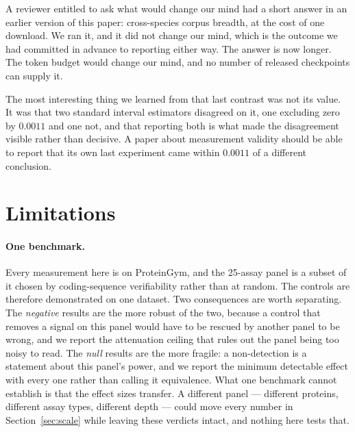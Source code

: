 \documentclass[11pt]{article}
\begin{document}
A reviewer entitled to ask what would change our mind had a short answer in an
earlier version of this paper: cross-species corpus breadth, at the cost of one
download. We ran it, and it did not change our mind, which is the outcome we had
committed in advance to reporting either way. The answer is now longer. The
token budget would change our mind, and no number of released checkpoints can
supply it.

The most interesting thing we learned from that last contrast was not its value.
It was that two standard interval estimators disagreed on it, one excluding zero
by $0.0011$ and one not, and that reporting both is what made the
disagreement visible rather than decisive. A paper about measurement validity
should be able to report that its own last experiment came within $0.0011$ of a
different conclusion.

\section*{Limitations}
\label{sec:future}

\paragraph{One benchmark.} Every measurement here is on ProteinGym, and the
25-assay panel is a subset of it chosen by coding-sequence verifiability rather
than at random. The controls are therefore demonstrated on one dataset. Two
consequences are worth separating. The \emph{negative} results are the more
robust of the two, because a control that removes a signal on this panel would
have to be rescued by another panel to be wrong, and we report the attenuation
ceiling that rules out the panel being too noisy to read. The \emph{null} results
are the more fragile: a non-detection is a statement about this panel's power, and
we report the minimum detectable effect with every one rather than calling it
equivalence. What one benchmark cannot establish is that the effect sizes
transfer. A different panel --- different proteins, different assay types,
different depth --- could move every number in Section~\ref{sec:scale} while
leaving these verdicts intact, and nothing here tests that.
\end{document}
